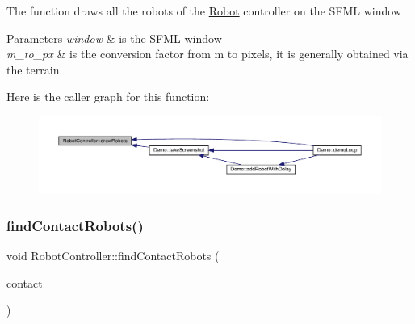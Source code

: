 The function draws all the robots of the \mbox{\hyperlink{class_robot}{Robot}} controller on the S\+F\+ML window 
\begin{DoxyParams}{Parameters}
{\em window} & is the S\+F\+ML window \\
\hline
{\em m\+\_\+to\+\_\+px} & is the conversion factor from m to pixels, it is generally obtained via the terrain \\
\hline
\end{DoxyParams}
Here is the caller graph for this function\+:\nopagebreak
\begin{figure}[H]
\begin{center}
\leavevmode
\includegraphics[width=350pt]{class_robot_controller_a2d4d4c93aed605c945e7a95876825bdc_icgraph}
\end{center}
\end{figure}
\mbox{\label{class_robot_controller_a11e413a1ac6466f360f46820d28b0f2e}} 
\subsubsection{\texorpdfstring{find\+Contact\+Robots()}{findContactRobots()}}
{\footnotesize\ttfamily void Robot\+Controller\+::find\+Contact\+Robots (\begin{DoxyParamCaption}\item[{b2\+Contact $\ast$}]{contact }\end{DoxyParamCaption})}

